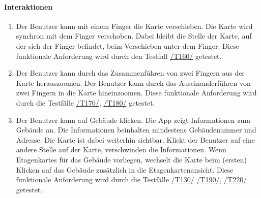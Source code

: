 \paragraph{Interaktionen}
\begin{enumerate}[start=12, label=\textbf{/FA\arabic*/}, align=left]
    \item \label{/FA12/} Der \Gls{Benutzer} kann mit einem Finger die \Gls{Karte} verschieben. Die \Gls{Karte} wird synchron mit dem Finger verschoben. Dabei bleibt die Stelle der \Gls{Karte}, auf der sich der Finger befindet, beim Verschieben unter dem Finger. Diese funktionale Anforderung wird durch den Testfall \hyperref[/T160/]{/T160/} getestet.
    \item \label{/FA13/} Der \Gls{Benutzer} kann durch das Zusammenführen von zwei Fingern aus der \Gls{Karte} herauszoomen. Der \Gls{Benutzer} kann durch das Auseinanderführen von zwei Fingern in die \Gls{Karte} hineinzoomen. Diese funktionale Anforderung wird durch die Testfälle \hyperref[/T170/]{/T170/}, \hyperref[/T180/]{/T180/} getestet.
    \item \label{/FA14/} Der \Gls{Benutzer} kann auf Gebäude klicken. Die App zeigt Informationen zum Gebäude an. Die Informationen beinhalten mindestens Gebäudenummer und Adresse. Die \Gls{Karte} ist dabei weiterhin sichtbar. Klickt der \Gls{Benutzer} auf eine andere Stelle auf der \Gls{Karte}, verschwinden die Informationen. Wenn \Glspl{Etagenkarte} für das Gebäude vorliegen, wechselt die \Gls{Karte} beim (ersten) Klicken auf das Gebäude zusätzlich in die \Gls{Etagenkartenansicht}. Diese funktionale Anforderung wird durch die Testfälle \hyperref[/T130/]{/T130/} \hyperref[/T190/]{/T190/}, \hyperref[/T220/]{/T220/} getestet.
\end{enumerate}
